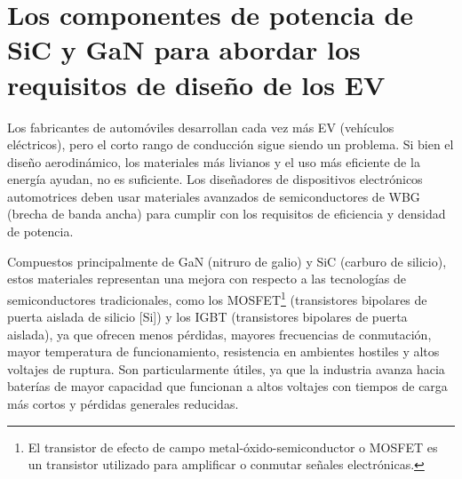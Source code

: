 \documentclass[12pt,letterpaper,superscriptaddress]{article}
\begin{document}
\section{Los componentes de potencia de SiC y GaN para abordar los requisitos de diseño de los EV}

Los fabricantes de automóviles desarrollan cada vez más EV (vehículos eléctricos), pero el corto rango de conducción sigue siendo un problema. Si bien el diseño aerodinámico, los materiales más livianos y el uso más eficiente de la energía ayudan, no es suficiente. Los diseñadores de dispositivos electrónicos automotrices deben usar materiales avanzados de semiconductores de WBG (brecha de banda ancha) para cumplir con los requisitos de eficiencia y densidad de potencia.

Compuestos principalmente de GaN (nitruro de galio) y SiC (carburo de silicio), estos materiales representan una mejora con respecto a las tecnologías de semiconductores tradicionales, como los MOSFET\footnote{El transistor de efecto de campo metal-óxido-semiconductor o MOSFET es un transistor utilizado para amplificar o conmutar señales electrónicas.} (transistores bipolares de puerta aislada de silicio [Si]) y los IGBT (transistores bipolares de puerta aislada), ya que ofrecen menos pérdidas, mayores frecuencias de conmutación, mayor temperatura de funcionamiento, resistencia en ambientes hostiles y altos voltajes de ruptura. Son particularmente útiles, ya que la industria avanza hacia baterías de mayor capacidad que funcionan a altos voltajes con tiempos de carga más cortos y pérdidas generales reducidas.

\clearpage

\end{document}
